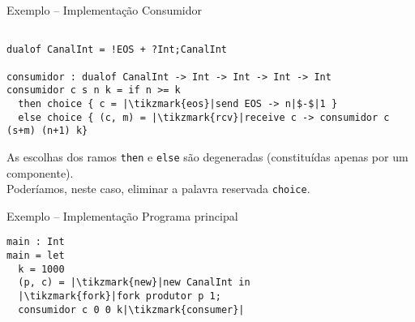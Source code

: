 \begin{frame}[fragile]{Exemplo -- Implementação  \hfill \color{mLightBrown}Consumidor}
  \begin{lstlisting}[xleftmargin=-.04\textwidth]

dualof CanalInt = !EOS + ?Int;CanalInt
    
consumidor : dualof CanalInt -> Int -> Int -> Int -> Int
consumidor c s n k = if n >= k
  then choice { c = |\tikzmark{eos}|send EOS -> n|$-$|1 }
  else choice { (c, m) = |\tikzmark{rcv}|receive c -> consumidor c (s+m) (n+1) k}
\end{lstlisting}


 
\begin{tcolorbox}
  As escolhas dos ramos \lstinline|then| e \lstinline|else| são degeneradas (constituídas apenas por um componente).\\
  Poderíamos, neste caso, eliminar a palavra reservada \lstinline|choice|.
\end{tcolorbox}

\end{frame}

\begin{frame}[fragile]{Exemplo -- Implementação  \hfill \color{mLightBrown}Programa principal}
  \begin{lstlisting}[xleftmargin=.2\textwidth, xrightmargin=.15\textwidth]
main : Int
main = let
  k = 1000
  (p, c) = |\tikzmark{new}|new CanalInt in
  |\tikzmark{fork}|fork produtor p 1;
  consumidor c 0 0 k|\tikzmark{consumer}|
\end{lstlisting}



\end{frame}


 